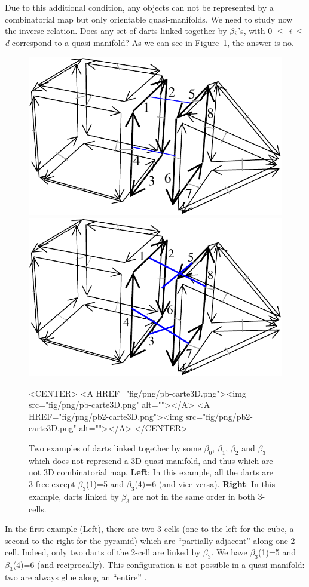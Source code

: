 Due to this additional condition, any objects can not be represented
by a combinatorial map but only orientable quasi-manifolds. We need to
study now the inverse relation. Does any set of darts linked together by
$\beta_{i}$'s, with 0 $\leq$ \emph{i} $\leq$ \emph{d} correspond to a quasi-manifold?  As
we can see in Figure~\ref{fig-pb-carte}, the answer is no.
%
\begin{figure}[ht]
  \begin{ccTexOnly}
    \begin{center}
      \includegraphics[width=.4\textwidth]
      {Combinatorial_map/fig/pdf/pb-carte3D}
      \qquad
      \includegraphics[width=.4\textwidth]
      {Combinatorial_map/fig/pdf/pb2-carte3D}
    \end{center}
  \end{ccTexOnly}
  \begin{ccHtmlOnly}
    <CENTER>
    <A HREF="fig/png/pb-carte3D.png"><img src="fig/png/pb-carte3D.png" alt=""></A>
    <A HREF="fig/png/pb2-carte3D.png"><img src="fig/png/pb2-carte3D.png" alt=""></A>
    </CENTER>
    \end{ccHtmlOnly}
    \caption{Two examples of darts linked together by some $\beta_0$,
      $\beta_1$, $\beta_2$ and $\beta_3$ which does not represend a 3D
      quasi-manifold, and thus which are not 3D combinatorial map. 
      \textbf{Left}: In this example, all the darts are 3-free except
      $\beta_3$(1)=5 and $\beta_3$(4)=6 (and vice-versa).
      \textbf{Right}: In this example, darts linked by $\beta_3$ 
      are not in the same order in both 3-cells.
    }
    \label{fig-pb-carte}
\end{figure}

In the first example (Left), there are two 3-cells (one to the left
for the cube, a second to the right for the pyramid) which are
``partially adjacent'' along one 2-cell. Indeed, only two darts
of the 2-cell are linked by $\beta_3$. We have $\beta_3$(1)=5 and
$\beta_3$(4)=6 (and reciprocally).  This configuration is not possible
in a quasi-manifold: two  are always glue along an ``entire''
.

